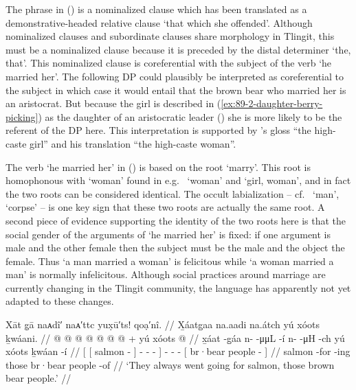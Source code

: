 The phrase  in (\lastx) is a nominalized clause which has been translated as a demonstrative-headed relative clause ‘that which she offended’.
Although nominalized clauses and subordinate clauses share morphology in Tlingit, this must be a nominalized clause because it is preceded by the distal determiner  ‘the, that’.
This nominalized clause is coreferential with the subject of the verb  ‘he married her’.
The following DP  could plausibly be interpreted as coreferential to the subject in which case it would entail that the brown bear who married her is an aristocrat.
But because the girl is described in (\ref{ex:89-2-daughter-berry-picking}) as the daughter of an aristocratic leader () she is more likely to be the referent of the DP  here.
This interpretation is supported by \citeauthor{swanton:1909}’s gloss “the high-caste girl” and his translation “the high-caste woman”.

The verb  ‘he married her’ in (\lastx) is based on the root  ‘marry’.
This root is homophonous with  ‘woman’ found in e.g.\  ‘woman’ and  ‘girl, woman’, and in fact the two roots can be considered identical.
The occult labialization – cf.\  ‘man’,  ‘corpse’ – is one key sign that these two roots are actually the same root.
A second piece of evidence supporting the identity of the two roots here is that the social gender of the arguments of  ‘he married her’ is fixed: if one argument is male and the other female then the subject must be the male and the object the female.
Thus  ‘a man married a woman’ is felicitous while  ‘a woman married a man’ is normally infelicitous.
Although social practices around marriage are currently changing in the Tlingit community, the language has apparently not yet adapted to these changes.

\ex\label{ex:89-22-go-for-salmon}%
%
\begingl
	\glpreamble	Xāt g̣ā naᴀdî′ naᴀ′ttc yux̣ū′ts! qoạ′nî. //
	\glpreamble	X̱áatg̱aa na.aadi na.átch yú xóots ḵwáani. //
	\gla	{} {}  @ {} {} 
			 @ {} @ {} @ {} {}
		 @ {} @ {} @ {} +
		{} yú xóots  @ {} {} //
	\glb	{} {} x̱áat -g̱áa {}
			n-  -μμL -í {}
		n-  -μH -ch
		{} yú xóots ḵwáan -í {} //
	\glc	{}[ {}[ salmon - {}]
			-  - - {}]
		-  - -
		{}[  br·bear people - {}] //
	\gld	{} {} salmon -for {}
			 {} {} -ing {}
		 {} {} {}
		{} those br·bear people -of {} //
	\glft	‘They always went going for salmon, those brown bear people.’
		//
\endgl
\xe

